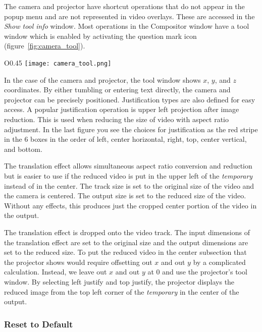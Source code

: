 The camera and projector have shortcut operations that do not appear in the popup menu and are not represented in video overlays. 
These are accessed in the \emph{Show tool info} window.
Most operations in the Compositor window have a tool window which is enabled by activating the question mark icon (figure~\ref{fig:camera_tool}).

\begin{wrapfigure}[10]{O}{0.45\linewidth} 
	\vspace{1ex}
    \texttt{[image: camera\_tool.png]}
    \caption{Camera and Projector tool}
    \label{fig:camera_tool}
\end{wrapfigure}

In the case of the camera and projector, the tool window shows $x$, $y$, and $z$ coordinates. 
By either tumbling or entering text directly, the camera and projector can be precisely positioned.  
Justification types are also defined for easy access. 
A popular justification operation is upper left projection after image reduction. 
This is used when reducing the size of video with aspect ratio adjustment.  
In the last figure you see the choices for justification as the red stripe in the 6 boxes in the order of left, center horizontal, right, top, center vertical, and bottom.

The translation effect allows simultaneous aspect ratio conversion and reduction but is easier to use if the reduced video is put in the upper left of the \textit{temporary} instead of in the center. 
The track size is set to the original size of the video and the camera is centered. 
The output size is set to the reduced size of the video. 
Without any effects, this produces just the cropped center portion of the video in the output.

The translation effect is dropped onto the video track. The input dimensions of the translation effect are set to the original size and the output dimensions are set to the reduced size. 
To put the reduced video in the center subsection that the projector shows would require offsetting out $x$ and out $y$ by a complicated calculation. 
Instead, we leave out $x$ and out $y$ at 0 and use the projector's tool window. 
By selecting left justify and top justify, the projector displays the reduced image from the top left corner of the \textit{temporary} in the center of the output.

\subsubsection*{Reset to Default}%
\label{ssub:reset_default}

